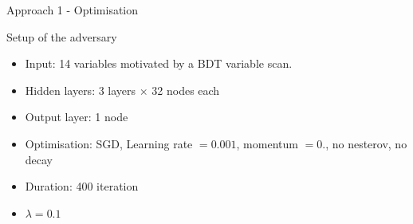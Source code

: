\begin{frame}{Approach 1 - Optimisation}
\begin{block}{Setup of the adversary}
    \begin{itemize}
    \item Input: \num{14} variables motivated by a BDT variable scan.
    \item Hidden layers: \num{3} \ELU layers $\times$ \num{32} nodes each
    \item Output layer: \num{1} \SIGMOID node
    \item Optimisation: SGD, Learning rate $=0.001$, momentum $=0.$, no nesterov, no decay
    \item Duration: 400 iteration
    \item $\lambda = 0.1$
    \end{itemize}
    \end{block}
\end{frame}

